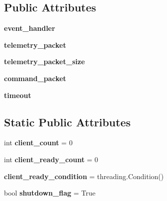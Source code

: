 \subsection*{Public Attributes}
\begin{DoxyCompactItemize}
\item 
{\bfseries event\+\_\+handler}\label{classarte__server_1_1_threaded_t_c_p_request_handler_acb7ca1e04757a16a62626bdf7f5008ef}

\item 
{\bfseries telemetry\+\_\+packet}\label{classarte__server_1_1_threaded_t_c_p_request_handler_a8af821daa5ec7e35dc2ba91b642b78c9}

\item 
{\bfseries telemetry\+\_\+packet\+\_\+size}\label{classarte__server_1_1_threaded_t_c_p_request_handler_ad2fc8de9a776dc2320fe84bfe978904b}

\item 
{\bfseries command\+\_\+packet}\label{classarte__server_1_1_threaded_t_c_p_request_handler_a44d9653a4470310cf30d4bb8c6a1f5ab}

\item 
{\bfseries timeout}\label{classarte__server_1_1_threaded_t_c_p_request_handler_a5eeb312700df4854e1771ae5b4106e78}

\end{DoxyCompactItemize}
\subsection*{Static Public Attributes}
\begin{DoxyCompactItemize}
\item 
int {\bfseries client\+\_\+count} = 0\label{classarte__server_1_1_threaded_t_c_p_request_handler_a98f8949f9326b5589c711ce73c37922d}

\item 
int {\bfseries client\+\_\+ready\+\_\+count} = 0\label{classarte__server_1_1_threaded_t_c_p_request_handler_ac6a056c2d852051917153be509e4b5b1}

\item 
{\bfseries client\+\_\+ready\+\_\+condition} = threading.\+Condition()\label{classarte__server_1_1_threaded_t_c_p_request_handler_a1a637d340f871ff306739793d977a314}

\item 
bool {\bfseries shutdown\+\_\+flag} = True\label{classarte__server_1_1_threaded_t_c_p_request_handler_ab5b9a6b90221114ec45897ca79e6856a}

\end{DoxyCompactItemize}


